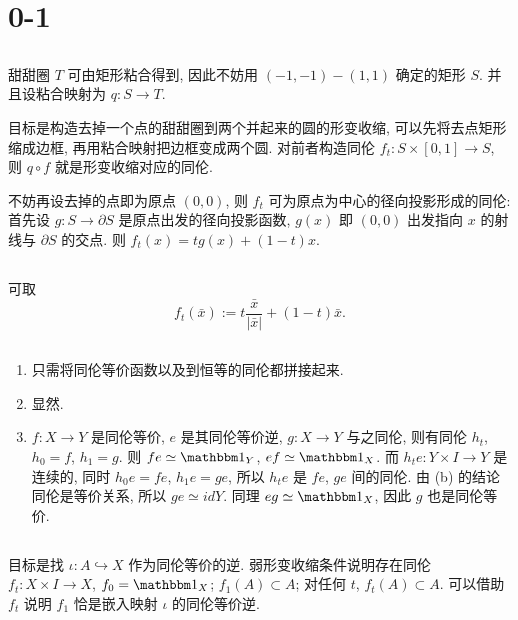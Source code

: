 \section{0-1}

\subsection{} %
甜甜圈 $T$ 可由矩形粘合得到, 因此不妨用 $(-1, -1) - (1, 1)$ 确定的矩形 $S$. 并且设粘合映射为 $q:S \rightarrow T$.

目标是构造去掉一个点的甜甜圈到两个并起来的圆的形变收缩, 可以先将去点矩形缩成边框, 再用粘合映射把边框变成两个圆. 对前者构造同伦 $f_t: S \times [0, 1] \rightarrow S$, 则 $q \circ f$ 就是形变收缩对应的同伦.

不妨再设去掉的点即为原点 $(0, 0)$, 则 $f_t$ 可为原点为中心的径向投影形成的同伦: 首先设 $g:S \rightarrow \partial S$ 是原点出发的径向投影函数, $g(x)$ 即 $(0, 0)$ 出发指向 $x$ 的射线与 $\partial S$ 的交点. 则 $f_t(x) = tg(x) + (1 - t)x$.

\subsection{} %
可取
$$
f_t(\bar{x}) := t\dfrac{\bar{x}}{|\bar{x}|} + (1 - t)\bar{x}.
$$

\subsection{} %
\begin{enumerate}[label=(\alph*)]
    \item 只需将同伦等价函数以及到恒等的同伦都拼接起来.
    \item 显然.
    \item $f:X \rightarrow Y$ 是同伦等价, $e$ 是其同伦等价逆, $g: X \rightarrow Y$ 与之同伦, 则有同伦 $h_t$, $h_0 = f$, $h_1 = g$. 则 $fe \simeq \id{Y}$, $ef \simeq \id{X}$. 而 $h_te: Y \times I \rightarrow Y$ 是连续的, 同时 $h_0e = fe$, $h_1e = ge$, 所以 $h_te$ 是 $fe$, $ge$ 间的同伦. 由 (b) 的结论同伦是等价关系, 所以 $ge \simeq id{Y}$. 同理 $eg \simeq \id{X}$, 因此 $g$ 也是同伦等价.
\end{enumerate}

\subsection{} %
目标是找 $\iota: A \hookrightarrow X$ 作为同伦等价的逆. 弱形变收缩条件说明存在同伦 $f_t:X \times I \rightarrow X$, $f_0 = \id{X}$; $f_1(A) \subset A$; 对任何 $t$, $f_t(A) \subset A$. 可以借助 $f_t$ 说明 $f_1$ 恰是嵌入映射 $\iota$ 的同伦等价逆.

